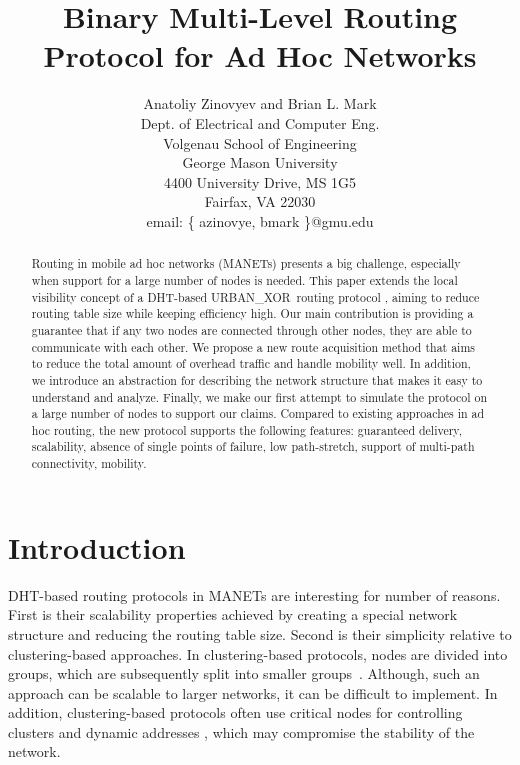 \documentclass[conference]{IEEEtran}
\title{Binary Multi-Level Routing Protocol for Ad Hoc Networks}
\author{
  Anatoliy Zinovyev and Brian L. Mark \\
  Dept. of  Electrical and Computer Eng. \\
  Volgenau School of Engineering \\
  George Mason University \\
  4400 University Drive, MS 1G5 \\
  Fairfax, VA 22030 \\
  email:   \{  azinovye, bmark \}@gmu.edu \\
}
\theoremstyle{definition}
\newcommand{\urbanxor}{URBAN\_XOR}
\begin{document}
\maketitle

\begin{abstract}
Routing in mobile ad hoc networks (MANETs) presents a big challenge, especially when support for a large number of nodes is needed. This paper extends the local visibility concept of a DHT-based \urbanxor\ routing protocol \cite{urbanxor}, aiming to reduce routing table size while keeping efficiency high. Our main contribution is providing a guarantee that if any two nodes are connected through other nodes, they are able to communicate with each other. We propose a new route acquisition method that aims to reduce the total amount of overhead traffic and handle mobility well. In addition, we introduce an abstraction for describing the network structure that makes it easy to understand and analyze. Finally, we make our first attempt to simulate the protocol on a large number of nodes to support our claims. Compared to existing approaches in ad hoc routing, the new protocol supports the following features: guaranteed delivery, scalability, absence of single points of failure, low path-stretch, support of multi-path connectivity, mobility.
\end{abstract}



\section{Introduction}
\label{sec:introduction}

DHT-based routing protocols in MANETs are interesting for number of reasons. First is their scalability properties achieved by creating a special network structure and reducing the routing table size. Second is their simplicity relative to clustering-based approaches. In clustering-based protocols, nodes are divided into groups, which are subsequently split into smaller groups~\cite{Hong}. Although, such an approach can be scalable to larger networks, it can be difficult to implement. In addition, clustering-based protocols often use critical nodes for controlling clusters \cite{Hong} and dynamic addresses \cite{Hong, dart, ntk}, which may compromise the stability of the network.
\end{document}
